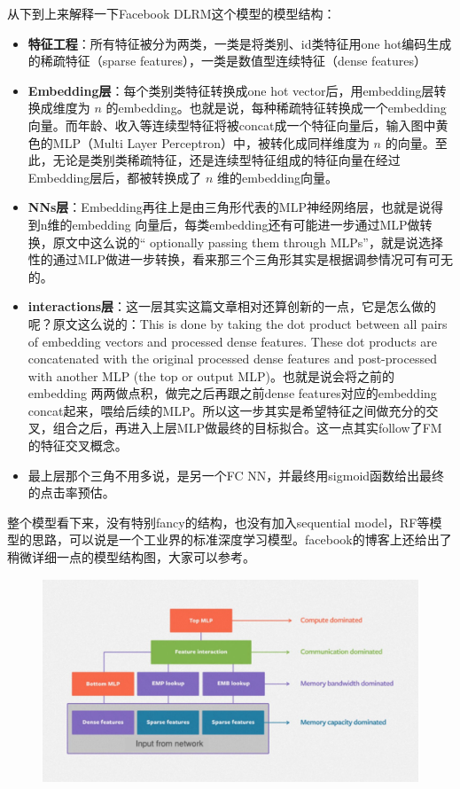 \documentclass[12pt]{article}
\begin{document}
从下到上来解释一下Facebook DLRM这个模型的模型结构：
\begin{itemize}
\setlength{\itemsep}{0pt}
\setlength{\parsep}{0pt}
\setlength{\parskip}{0pt}
    \item \textbf{特征工程}：所有特征被分为两类，一类是将类别、id类特征用one hot编码生成的稀疏特征（sparse features），一类是数值型连续特征（dense features）
    \item \textbf{Embedding层}：每个类别类特征转换成one hot vector后，用embedding层转换成维度为 $n$ 的embedding。也就是说，每种稀疏特征转换成一个embedding向量。而年龄、收入等连续型特征将被concat成一个特征向量后，输入图中黄色的MLP（Multi Layer Perceptron）中，被转化成同样维度为 $n$ 的向量。至此，无论是类别类稀疏特征，还是连续型特征组成的特征向量在经过Embedding层后，都被转换成了 $n$ 维的embedding向量。
    \item \textbf{NNs层}：Embedding再往上是由三角形代表的MLP神经网络层，也就是说得到n维的embedding 向量后，每类embedding还有可能进一步通过MLP做转换，原文中这么说的“ optionally passing them through MLPs”，就是说选择性的通过MLP做进一步转换，看来那三个三角形其实是根据调参情况可有可无的。
    \item \textbf{interactions层}：这一层其实这篇文章相对还算创新的一点，它是怎么做的呢？原文这么说的：This is done by taking the dot product between all pairs of embedding vectors and processed dense features. These dot products are concatenated with the original processed dense features and post-processed with another MLP (the top or output MLP)。也就是说会将之前的 embedding 两两做点积，做完之后再跟之前dense features对应的embedding concat起来，喂给后续的MLP。所以这一步其实是希望特征之间做充分的交叉，组合之后，再进入上层MLP做最终的目标拟合。这一点其实follow了FM的特征交叉概念。
    \item 最上层那个三角不用多说，是另一个FC NN，并最终用sigmoid函数给出最终的点击率预估。
\end{itemize}

整个模型看下来，没有特别fancy的结构，也没有加入sequential model，RF等模型的思路，可以说是一个工业界的标准深度学习模型。facebook的博客上还给出了稍微详细一点的模型结构图，大家可以参考。
\begin{figure}[H]
    \centering
    \includegraphics[width=.6\textwidth]{fig/Facebook_DLRM_Structure_Detail.jpg}
\end{figure}
\end{document}
